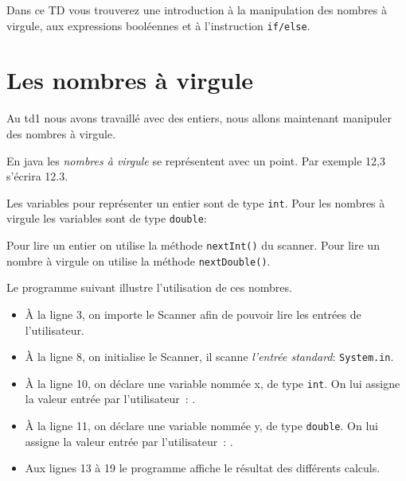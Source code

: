 \documentclass[a4paper,11pt]{article}
\date{2018 -- 2019}
\begin{document}
\entete
\titre
{}
\lastedit


	Dans ce TD vous trouverez une introduction à la manipulation des nombres à virgule,
	aux expressions booléennes et à l'instruction \texttt{if/else}.
	\tableofcontents

	\newpage

\section{Les nombres à virgule}


	Au td1 nous avons travaillé avec des entiers, nous allons maintenant 
	manipuler des nombres à virgule.

	En java les \emph{nombres à virgule} se représentent avec un point. 
	Par exemple 12,3 s'écrira 12.3.

	Les variables pour représenter un entier sont de type \texttt{int}.
	Pour les nombres à virgule les variables sont de type \texttt{double}:
	

	Pour lire un entier on utilise la méthode \texttt{nextInt()} du scanner.
	Pour lire un nombre à virgule on utilise la méthode \texttt{nextDouble()}.
	


	Le programme suivant illustre l'utilisation de ces nombres.

	\bigskip

	\begin{itemize}
		\item \`A la ligne 3, on importe le Scanner afin de pouvoir lire les entrées de l'utilisateur.
		\item \`A la ligne 8, on initialise le Scanner, il scanne \emph{l'entrée standard}: 
			\texttt{System.in}.

		\item \`A la ligne 10, on déclare une variable nommée x, de type \texttt{int}. 
			On lui assigne la valeur entrée par l'utilisateur~: .

		\item \`A la ligne 11, on déclare une variable nommée y, de type \texttt{double}.
			On lui assigne la valeur entrée par l'utilisateur~: .

		\item Aux lignes 13 à 19 le programme affiche le résultat des différents calculs.

	\end{itemize}
\end{document}
